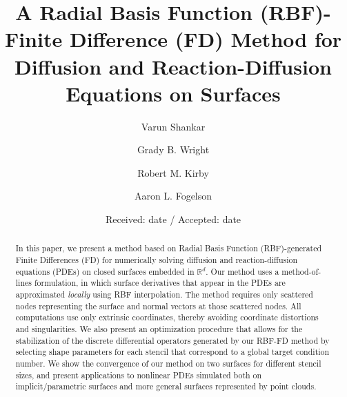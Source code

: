 \documentclass[smallextended]{svjour3}
\begin{document}
\title{A Radial Basis Function (RBF)-Finite Difference (FD) Method for Diffusion and Reaction-Diffusion Equations on Surfaces}

\author{Varun Shankar\and Grady B. Wright\and Robert M. Kirby\and Aaron L. Fogelson}

\date{Received: date / Accepted: date}
\maketitle
\begin{abstract}
In this paper, we present a method based on Radial Basis Function (RBF)-generated Finite Differences (FD) for numerically solving diffusion and reaction-diffusion equations (PDEs) on closed surfaces embedded in $\mathbb{R}^d$. Our method uses a method-of-lines formulation, in which surface derivatives that appear in the PDEs are approximated \emph{locally} using RBF interpolation. The method requires only scattered nodes representing the surface and normal vectors at those scattered nodes. All computations use only extrinsic coordinates, thereby avoiding coordinate distortions and singularities. We also present an optimization procedure that allows for the stabilization of the discrete differential operators generated by our RBF-FD method by selecting shape parameters for each stencil that correspond to a global target condition number. We show the convergence of our method on two surfaces for different stencil sizes, and present applications to nonlinear PDEs simulated both on implicit/parametric surfaces and more general surfaces represented by point clouds.
\end{abstract}
\end{document}
